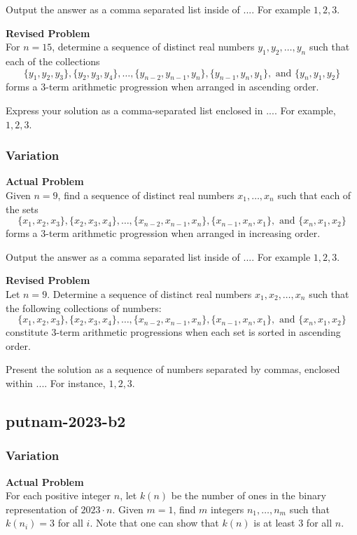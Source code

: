 Output the answer as a comma separated list inside of $\boxed{...}$. For example $\boxed{1, 2, 3}$.

\textbf{Revised Problem}\\
For $n = 15$, determine a sequence of distinct real numbers $y_1, y_2, \ldots, y_n$ such that each of the collections $$\{y_1, y_2, y_3\}, \{y_2, y_3, y_4\}, \ldots, \{y_{n-2}, y_{n-1}, y_n\}, \{y_{n-1}, y_n, y_1\}, \text{ and } \{y_n, y_1, y_2\}$$ forms a 3-term arithmetic progression when arranged in ascending order.

Express your solution as a comma-separated list enclosed in $\boxed{...}$. For example, $\boxed{1, 2, 3}$.

\subsubsection{Variation}
\textbf{Actual Problem}\\
Given $n = 9$, find a sequence of distinct real numbers $x_1, \ldots, x_n$ such that each of the sets$$\{x_1, x_2, x_3\}, \{x_2, x_3, x_4\},\ldots,\{x_{n-2}, x_{n-1}, x_n\}, \{x_{n-1}, x_n, x_1\},\text{ and } \{x_n, x_1, x_2\}$$ forms a 3-term arithmetic progression when arranged in increasing order.

Output the answer as a comma separated list inside of $\boxed{...}$. For example $\boxed{1, 2, 3}$.

\textbf{Revised Problem}\\
Let $n = 9$. Determine a sequence of distinct real numbers $x_1, x_2, \ldots, x_n$ such that the following collections of numbers:
$$\{x_1, x_2, x_3\}, \{x_2, x_3, x_4\}, \ldots, \{x_{n-2}, x_{n-1}, x_n\}, \{x_{n-1}, x_n, x_1\}, \text{ and } \{x_n, x_1, x_2\}$$
constitute 3-term arithmetic progressions when each set is sorted in ascending order.

Present the solution as a sequence of numbers separated by commas, enclosed within $\boxed{...}$. For instance, $\boxed{1, 2, 3}$.

\subsection{putnam-2023-b2}
\subsubsection{Variation}
\textbf{Actual Problem}\\
For each positive integer $n$, let $k(n)$ be the number of ones in the binary representation of $2023 \cdot n$. 
Given $m = 1$, find $m$ integers $n_1, \dots, n_m$ such that $k(n_i) = 3$ for all $i$.
Note that one can show that $k(n)$ is at least $3$ for all $n$.

